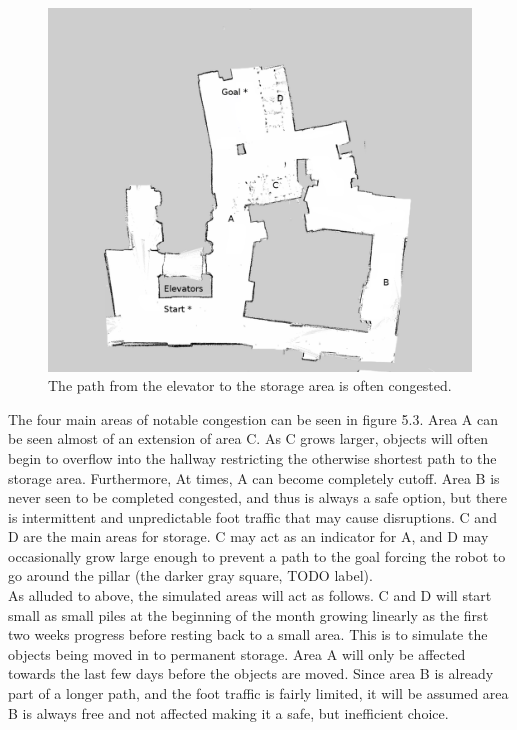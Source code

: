 \begin{figure}[!htb]
  \centering
  \includegraphics[width=\linewidth]{images/basement_congestion.png}
  \caption{The path from the elevator to the storage area is often congested. }
  \label{figure:basement_congestion}
\end{figure}

The four main areas of notable congestion can be seen in figure 5.3. Area A
can be seen almost of an extension of area C. As C grows larger, objects will
often begin to overflow into the hallway restricting the otherwise shortest
path to the storage area. Furthermore, At times, A can become completely cutoff.
Area B is never seen to be completed congested, and thus is always a safe option,
but there is intermittent and unpredictable foot traffic that may cause disruptions.
C and D are the main areas for storage. C may act as an indicator for A, and
D may occasionally grow large enough to prevent a path to the goal forcing the
robot to go around the pillar (the darker gray square, TODO label).\\

As alluded to above, the simulated areas will act as follows. C and D will start
small as small piles at the beginning of the month growing linearly as the first
two weeks progress before resting back to a small area. This is to simulate the
objects being moved in to permanent storage. Area A will only be affected towards the
last few days before the objects are moved. Since area B is already part of a
longer path, and the foot traffic is fairly limited, it will be assumed area B
is always free and not affected making it a safe, but inefficient choice.



